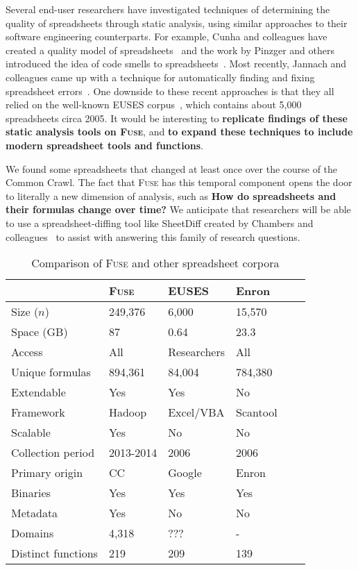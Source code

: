 \documentclass[conference]{IEEEtran}
\begin{document}
Several end-user researchers have investigated techniques of determining the quality of spreadsheets through static analysis, using similar approaches to their software engineering counterparts.
For example, Cunha and colleagues have created a quality model of spreadsheets~\cite{Cunha2012}
and the work by Pinzger and others introduced the idea of code smells to spreadsheets~\cite{Pinzger2012}.
Most recently, Jannach and colleagues came up with a technique for automatically finding and fixing spreadsheet errors~\cite{jannach2014}.
One downside to these recent approaches is that they all relied on the well-known EUSES corpus~\cite{Fisher2005}, which contains about 5,000 spreadsheets circa 2005.
It would be interesting to \textbf{replicate findings of these static analysis tools on \textsc{Fuse}}, and \textbf{to expand these techniques to include modern spreadsheet tools and functions}.

We found some spreadsheets that changed at least once over the course of the Common Crawl.
The fact that \textsc{Fuse} has this temporal component opens the door to literally a new dimension of analysis, such as \textbf{How do spreadsheets and their formulas change over time?}
We anticipate that researchers will be able to use a spreadsheet-diffing tool like SheetDiff created by Chambers and colleagues~\cite{chambers2010} to assist with answering this family of research questions.

\begin{table}[!t]
\caption{Comparison of \textsc{Fuse} and other spreadsheet corpora\label{tab:corpora}}
\centering
\begin{tabular}{llllll}
\toprule
 & \textbf{\textsc{Fuse}} & \textbf{EUSES} & \textbf{Enron} \\
\midrule
Size ($n$) & 249,376 & 6,000 & 15,570\\   %
Space (GB) & 87  & 0.64 & 23.3\\
Access & All & Researchers & All \\
Unique formulas & 894,361 & 84,004 & 784,380 \\
Extendable & Yes & Yes & No\\
Framework & Hadoop & Excel/VBA & Scantool \\
Scalable & Yes & No & No\\
Collection period & 2013-2014 & 2006 & 2006 \\
Primary origin & CC & Google & Enron \\
Binaries & Yes  & Yes & Yes \\
Metadata & Yes & No & No \\
Domains & 4,318 & ??? & - \\
Distinct functions & 219 & 209 & 139 \\
\bottomrule
\end{tabular}
\end{table}
\end{document}
